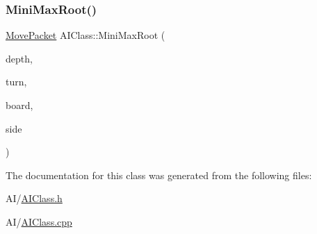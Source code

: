 \mbox{\label{class_a_i_class_a1331ae0a516f5987f0f23048d42edc95}} 
\subsubsection{\texorpdfstring{Mini\+Max\+Root()}{MiniMaxRoot()}}
{\footnotesize\ttfamily \hyperlink{struct_move_packet}{Move\+Packet} A\+I\+Class\+::\+Mini\+Max\+Root (\begin{DoxyParamCaption}\item[{int}]{depth,  }\item[{\hyperlink{_piece_8h_ad7595c48bb74c0dd2a7648712a2d4985}{Piece\+Color}}]{turn,  }\item[{std\+::shared\+\_\+ptr$<$ \hyperlink{class_base_board}{Base\+Board} $>$}]{board,  }\item[{\hyperlink{_piece_8h_ad7595c48bb74c0dd2a7648712a2d4985}{Piece\+Color}}]{side }\end{DoxyParamCaption})\hspace{0.3cm}{\ttfamily [static]}}



The documentation for this class was generated from the following files\+:\begin{DoxyCompactItemize}
\item 
A\+I/\hyperlink{_a_i_class_8h}{A\+I\+Class.\+h}\item 
A\+I/\hyperlink{_a_i_class_8cpp}{A\+I\+Class.\+cpp}\end{DoxyCompactItemize}
